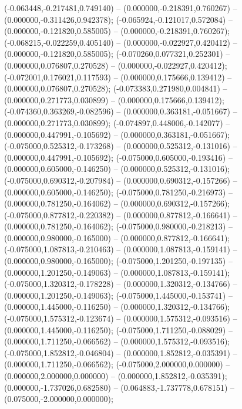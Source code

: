  (-0.063448,-0.217481,0.749140) -- (0.000000,-0.218391,0.760267) -- (0.000000,-0.311426,0.942378);
 (-0.065924,-0.121017,0.572084) -- (0.000000,-0.121820,0.585005) -- (0.000000,-0.218391,0.760267);
 (-0.068215,-0.022259,0.405140) -- (0.000000,-0.022927,0.420412) -- (0.000000,-0.121820,0.585005);
 (-0.070260,0.077321,0.252301) -- (0.000000,0.076807,0.270528) -- (0.000000,-0.022927,0.420412);
 (-0.072001,0.176021,0.117593) -- (0.000000,0.175666,0.139412) -- (0.000000,0.076807,0.270528);
 (-0.073383,0.271980,0.004841) -- (0.000000,0.271773,0.030899) -- (0.000000,0.175666,0.139412);
 (-0.074360,0.363269,-0.082596) -- (0.000000,0.363181,-0.051667) -- (0.000000,0.271773,0.030899);
 (-0.074897,0.448006,-0.142077) -- (0.000000,0.447991,-0.105692) -- (0.000000,0.363181,-0.051667);
 (-0.075000,0.525312,-0.173268) -- (0.000000,0.525312,-0.131016) -- (0.000000,0.447991,-0.105692);
 (-0.075000,0.605000,-0.193416) -- (0.000000,0.605000,-0.146250) -- (0.000000,0.525312,-0.131016);
 (-0.075000,0.690312,-0.207984) -- (0.000000,0.690312,-0.157266) -- (0.000000,0.605000,-0.146250);
 (-0.075000,0.781250,-0.216973) -- (0.000000,0.781250,-0.164062) -- (0.000000,0.690312,-0.157266);
 (-0.075000,0.877812,-0.220382) -- (0.000000,0.877812,-0.166641) -- (0.000000,0.781250,-0.164062);
 (-0.075000,0.980000,-0.218213) -- (0.000000,0.980000,-0.165000) -- (0.000000,0.877812,-0.166641);
 (-0.075000,1.087813,-0.210463) -- (0.000000,1.087813,-0.159141) -- (0.000000,0.980000,-0.165000);
 (-0.075000,1.201250,-0.197135) -- (0.000000,1.201250,-0.149063) -- (0.000000,1.087813,-0.159141);
 (-0.075000,1.320312,-0.178228) -- (0.000000,1.320312,-0.134766) -- (0.000000,1.201250,-0.149063);
 (-0.075000,1.445000,-0.153741) -- (0.000000,1.445000,-0.116250) -- (0.000000,1.320312,-0.134766);
 (-0.075000,1.575312,-0.123674) -- (0.000000,1.575312,-0.093516) -- (0.000000,1.445000,-0.116250);
 (-0.075000,1.711250,-0.088029) -- (0.000000,1.711250,-0.066562) -- (0.000000,1.575312,-0.093516);
 (-0.075000,1.852812,-0.046804) -- (0.000000,1.852812,-0.035391) -- (0.000000,1.711250,-0.066562);
 (-0.075000,2.000000,0.000000) -- (0.000000,2.000000,0.000000) -- (0.000000,1.852812,-0.035391);
 (0.000000,-1.737026,0.682580) -- (0.064883,-1.737778,0.678151) -- (0.075000,-2.000000,0.000000);

